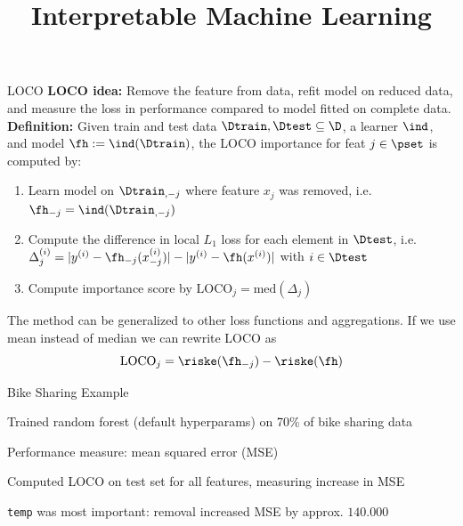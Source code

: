 \documentclass[10pt,compress,t,notes=noshow, xcolor=table]{beamer}
\title{Interpretable Machine Learning}
\begin{document}
	
	
	




\begin{framev}[align=top]{LOCO  }
%
\textbf{LOCO idea:} Remove the feature from data, refit model on reduced data, and measure the loss in performance compared to model fitted on complete data.\\
\pause
\spacer[0.25]
\textbf{Definition:} Given train and test data $\Dtrain, \Dtest \subseteq \D$, a learner $\ind$, and model $\fh := \ind(\Dtrain)$, the LOCO importance for feat $j \in \pset$ is computed by:\\
\spacer[0.25]
\begin{enumerate}
\item Learn model on ${\Dtrain}_{,-j}$ where feature $x_j$ was removed, i.e. $\fh_{-j} = \ind({\Dtrain}_{,-j})$
\pause
\item Compute the difference in local $L_1$ loss for each element in $\Dtest$, i.e. $\Delta_j^{(i)} = |y^{(i)} - \fh_{-j}(x_{-j}^{(i)})| - |y^{(i)} - \fh(x^{(i)})|$ with $i \in \Dtest$
\pause
\item Compute importance score by $\text{LOCO}_j = \text{med}(\Delta_j)$
\end{enumerate}
\spacer[0.25]
\pause
The method can be generalized to other loss functions and aggregations. If we use mean instead of median we can rewrite LOCO as
%
$$
\text{LOCO}_j = \riske(\fh_{-j}) - \riske(\fh)
$$
\end{framev}


\begin{framev}[align=top]{Bike Sharing Example}
%
%
\begin{itemizeS}
\item Trained random forest (default hyperparams) on 70\% of bike sharing data
\item Performance measure: mean squared error (MSE)
\item Computed LOCO on test set for all features, measuring increase in MSE
\item \texttt{temp} was most important: removal increased MSE by approx. $140.000$
\end{itemizeS}
\end{framev}
\end{document}
